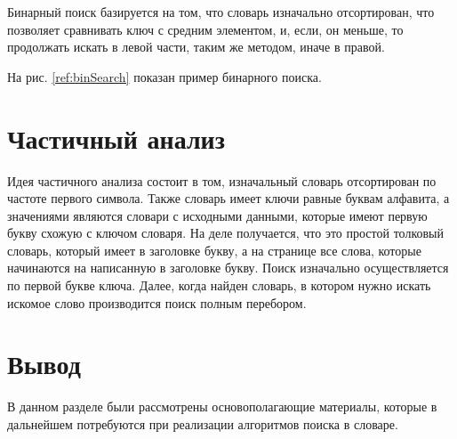 Бинарный поиск базируется на том, что словарь 
изначально отсортирован, что позволяет сравнивать
ключ с средним элементом, и, если, он меньше, то продолжать
искать в левой части, таким же методом, иначе в правой. 

На рис. \ref{ref:binSearch} показан пример бинарного поиска.

\begin{figure}[ht!]
\end{figure}

\section{Частичный анализ}

Идея частичного анализа состоит в том, изначальный словарь
отсортирован по частоте первого символа. 
Также словарь имеет ключи равные буквам алфавита, а значениями 
являются словари с исходными данными, которые имеют первую букву схожую с ключом словаря.
На деле получается, что это простой толковый словарь, который имеет
в заголовке букву, а на странице все слова, которые начинаются на
написанную в заголовке букву. Поиск изначально осуществляется
по первой букве ключа. Далее, когда найден словарь, в котором
нужно искать искомое слово производится поиск полным перебором.


\section{Вывод}

В данном разделе были рассмотрены
основополагающие материалы, которые в дальнейшем потребуются
при реализации алгоритмов поиска в словаре.

